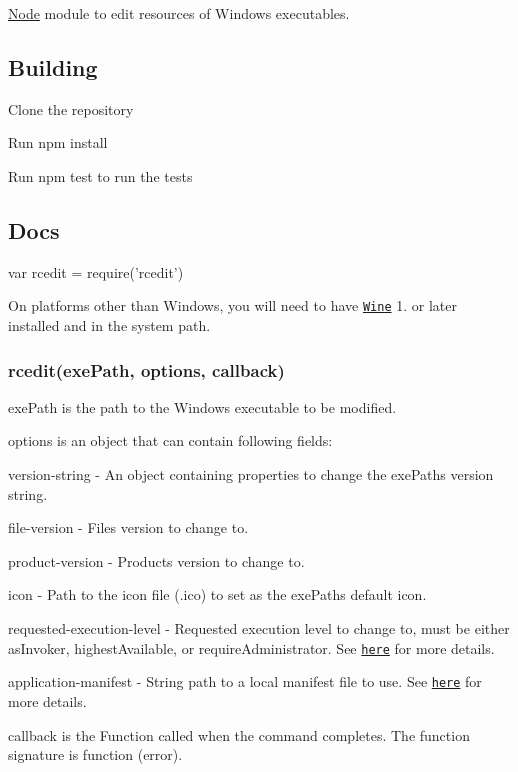 \href{https://travis-ci.org/electron/node-rcedit}{\tt } \href{https://ci.appveyor.com/project/electron-bot/node-rcedit/branch/master}{\tt }

\mbox{\hyperlink{classNode}{Node}} module to edit resources of Windows executables.

\subsection*{Building}


\begin{DoxyItemize}
\item Clone the repository
\item Run {\ttfamily npm install}
\item Run {\ttfamily npm test} to run the tests
\end{DoxyItemize}

\subsection*{Docs}


\begin{DoxyCode}
var rcedit = require('rcedit')
\end{DoxyCode}
 On platforms other than Windows, you will need to have \href{http://winehq.org}{\tt Wine} 1. or later installed and in the system path.

\subsubsection*{{\ttfamily rcedit(exe\+Path, options, callback)}}

{\ttfamily exe\+Path} is the path to the Windows executable to be modified.

{\ttfamily options} is an object that can contain following fields\+:


\begin{DoxyItemize}
\item {\ttfamily version-\/string} -\/ An object containing properties to change the {\ttfamily exe\+Path}\textquotesingle{}s version string.
\item {\ttfamily file-\/version} -\/ File\textquotesingle{}s version to change to.
\item {\ttfamily product-\/version} -\/ Product\textquotesingle{}s version to change to.
\item {\ttfamily icon} -\/ Path to the icon file ({\ttfamily .ico}) to set as the {\ttfamily exe\+Path}\textquotesingle{}s default icon.
\item {\ttfamily requested-\/execution-\/level} -\/ Requested execution level to change to, must be either {\ttfamily as\+Invoker}, {\ttfamily highest\+Available}, or {\ttfamily require\+Administrator}. See \href{https://msdn.microsoft.com/en-us/library/6ad1fshk.aspx#Anchor_9}{\tt here} for more details.
\item {\ttfamily application-\/manifest} -\/ String path to a local manifest file to use. See \href{https://msdn.microsoft.com/en-us/library/windows/desktop/aa374191.aspx}{\tt here} for more details.
\end{DoxyItemize}

{\ttfamily callback} is the {\ttfamily Function} called when the command completes. The function signature is {\ttfamily function (error)}. 